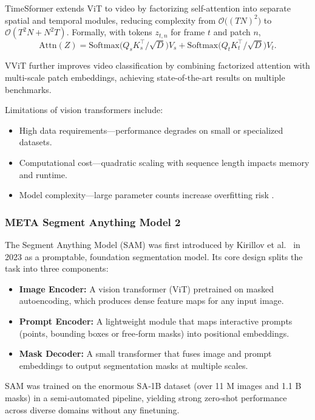 TimeSformer \cite{bertasius_timesformer_2021} extends ViT to video by factorizing self-attention into separate spatial and temporal modules, reducing complexity from $\mathcal{O}\bigl((TN)^2\bigr)$ to $\mathcal{O}(T^2N + N^2T)$. Formally, with tokens $z_{t,n}$ for frame $t$ and patch $n$,
\[
\mathrm{Attn}(Z)
= \mathrm{Softmax}\!\bigl(Q_sK_s^\top/\sqrt{D}\bigr)V_s
+ \mathrm{Softmax}\!\bigl(Q_tK_t^\top/\sqrt{D}\bigr)V_t.
\]

VViT \cite{arnab_vvit_2021} further improves video classification by combining factorized attention with multi-scale patch embeddings, achieving state-of-the-art results on multiple benchmarks.


Limitations of vision transformers include:
\begin{itemize}

    \item High data requirements—performance degrades on small or specialized datasets.  
    \item Computational cost—quadratic scaling with sequence length impacts memory and runtime.  
    \item Model complexity—large parameter counts increase overfitting risk \cite{lee_enhancing_mamba_s6_2024}.
\end{itemize}


\subsubsection{META Segment Anything Model 2}
\label{ssec:meta_sam2}

The Segment Anything Model (SAM) was first introduced by Kirillov et al.\ \cite{kirillov_segment_2023} in 2023 as a promptable, foundation segmentation model.  Its core design splits the task into three components:
\begin{itemize}
    \item \textbf{Image Encoder:} A vision transformer (ViT) pretrained on masked autoencoding, which produces dense feature maps for any input image.
    \item \textbf{Prompt Encoder:} A lightweight module that maps interactive prompts (points, bounding boxes or free‐form masks) into positional embeddings.
    \item \textbf{Mask Decoder:} A small transformer that fuses image and prompt embeddings to output segmentation masks at multiple scales.
\end{itemize}
SAM was trained on the enormous SA‑1B dataset (over 11 M images and 1.1 B masks) in a semi‑automated pipeline, yielding strong zero‑shot performance across diverse domains without any finetuning.


